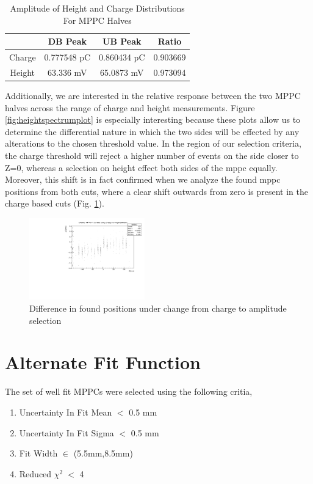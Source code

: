 \begin{table}[H]
    \centering
    \begin{tabular}{c||c|c|c}
         & DB Peak & UB Peak & Ratio \\
         \hline
        Charge & 0.777548 pC & 0.860434 pC & 0.903669 \\
        Height & 63.336 mV & 65.0873 mV & 0.973094
    \end{tabular}
    \caption{Amplitude of Height and Charge Distributions For MPPC Halves }
    \label{tab:qandhhalves}
\end{table}




Additionally, we are interested in the relative response between the two MPPC halves across the range of charge and height measurements.
Figure \ref{fig:heightspectrumplot} is especially interesting because these plots allow us to determine the differential nature in which the two sides will be effected by any alterations to the chosen threshold value. In the region of our selection criteria, the charge threshold will reject a higher number of events on the side closer to Z=0, whereas a selection on height effect both sides of the mppc equally. Moreover, this shift is in fact confirmed when we analyze the found mppc positions from both cuts, where a clear shift outwards from zero is present in the charge based cuts (Fig. \ref{fig:seldzvz}).
\begin{figure}
    \centering
    \includegraphics[width=5cm]{graphics/selectionshiftoverz.pdf}
    \caption{Difference in found positions under change from charge to amplitude selection}
    \label{fig:seldzvz}
\end{figure}








\section{Alternate Fit Function}
The set of well fit MPPCs were selected using the following critia,
\begin{enumerate}
    \item Uncertainty In Fit Mean $<$ 0.5 mm
    \item Uncertainty In Fit Sigma $<$ 0.5 mm
    \item Fit Width $\in$ (5.5mm,8.5mm)
    \item Reduced $\chi ^{2} \; <$ 4
\end{enumerate}

